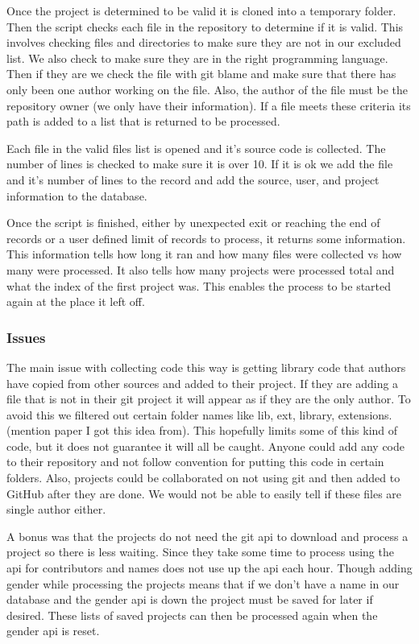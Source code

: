 \documentclass{article}
\begin{document}
Once the project is determined to be valid it is cloned into a temporary folder. Then the script checks each file in the repository to determine if it is valid. This involves checking files and directories to make sure they are not in our excluded list. We also check to make sure they are in the right programming language. Then if they are we check the file with git blame and make sure that there has only been one author working on the file. Also, the author of the file must be the repository owner (we only have their information). If a file meets these criteria its path is added to a list that is returned to be processed.

Each file in the valid files list is opened and it's source code is collected. The number of lines is checked to make sure it is over 10. If it is ok we add the file and it's number of lines to the record and add the source, user, and project information to the database.

Once the script is finished, either by unexpected exit or reaching the end of records or a user defined limit of records to process, it returns some information. This information tells how long it ran and how many files were collected vs how many were processed. It also tells how many projects were processed total and what the index of the first project was. This enables the process to be started again at the place it left off.


\subsubsection{Issues}
The main issue with collecting code this way is getting library code that authors have copied from other sources and added to their project. If they are adding a file that is not in their git project it will appear as if they are the only author. To avoid this we filtered out certain folder names like lib, ext, library, extensions. (mention paper I got this idea from). This hopefully limits some of this kind of code, but it does not guarantee it will all be caught. Anyone could add any code to their repository and not follow convention for putting this code in certain folders. Also, projects could be collaborated on not using git and then added to GitHub after they are done. We would not be able to easily tell if these files are single author either.

A bonus was that the projects do not need the git api to download and process a project so there is less waiting. Since they take some time to process using the api for contributors and names does not use up the api each hour. Though adding gender while processing the projects means that if we don't have a name in our database and the gender api is down the project must be saved for later if desired. These lists of saved projects can then be processed again when the gender api is reset.
\end{document}
